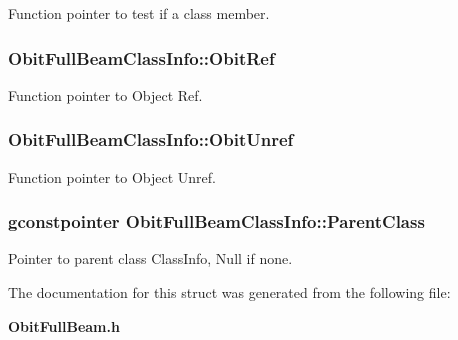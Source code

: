 Function pointer to test if a class member. 

\subsubsection{ {\bf Obit\-Full\-Beam\-Class\-Info::Obit\-Ref}}\label{structObitFullBeamClassInfo_o10}


Function pointer to Object Ref. 

\subsubsection{ {\bf Obit\-Full\-Beam\-Class\-Info::Obit\-Unref}}\label{structObitFullBeamClassInfo_o11}


Function pointer to Object Unref. 

\subsubsection{\setlength{\rightskip}{0pt plus 5cm}gconstpointer {\bf Obit\-Full\-Beam\-Class\-Info::Parent\-Class}}\label{structObitFullBeamClassInfo_o3}


Pointer to parent class Class\-Info, Null if none. 



The documentation for this struct was generated from the following file:\begin{CompactItemize}
\item 
{\bf Obit\-Full\-Beam.h}\end{CompactItemize}
